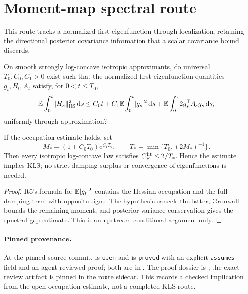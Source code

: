 \section{Moment-map spectral route}
\label{route:moment-map-spectral}

This route tracks a normalized first eigenfunction through localization, retaining the directional
posterior covariance information that a scalar covariance bound discards.

\begin{question}
  \label{q:mm-spectral-occupation}
  On smooth strongly log-concave isotropic approximants, do universal $T_0,C_0,C_1>0$ exist such
  that the normalized first eigenfunction quantities $g_t,H_t,A_t$ satisfy, for $0<t\le T_0$,
  \[
    \mathbb{E}\int_0^t\lVert H_s\rVert_{\mathrm{HS}}^2\,\mathrm d s
    \le C_0t+C_1\mathbb{E}\int_0^t\lvert g_s\rvert^2\,\mathrm d s
       +\mathbb{E}\int_0^t2g_s^\mathsf{T}A_sg_s\,\mathrm d s,
  \]
  uniformly through approximation?
\end{question}

\begin{proposition}
  \label{prop:spectral-sufficiency}
  If the occupation estimate holds, set
  \[
    M_*=(1+C_0T_0)e^{C_1T_0},
    \qquad
    T_* = \min\{T_0,(2M_*)^{-1}\}.
  \]
  Then every isotropic log-concave law satisfies $C_{\mathrm P}^{\mathrm{lit}}\le2/T_*$.  Hence the estimate implies
  KLS; no strict damping surplus or convergence of eigenfunctions is needed.
\end{proposition}
\begin{proof}
  It\^o's formula for $\mathbb{E}\lvert g_t\rvert^2$ contains the Hessian occupation and the full damping term
  with opposite signs.  The hypothesis cancels the latter, Gronwall bounds the remaining moment,
  and posterior variance conservation gives the spectral-gap estimate.  This is an upstream
  conditional argument only.
\end{proof}

\paragraph{Pinned provenance.}
At the pinned source commit,  is \texttt{open} and
 is \texttt{proved} with an explicit \texttt{assumes} field and an agent-reviewed proof; both are in
.  The proof dossier is
; the exact review artifact is pinned in the route
sidecar.  This records a checked implication from the open occupation estimate, not a completed
KLS route.

